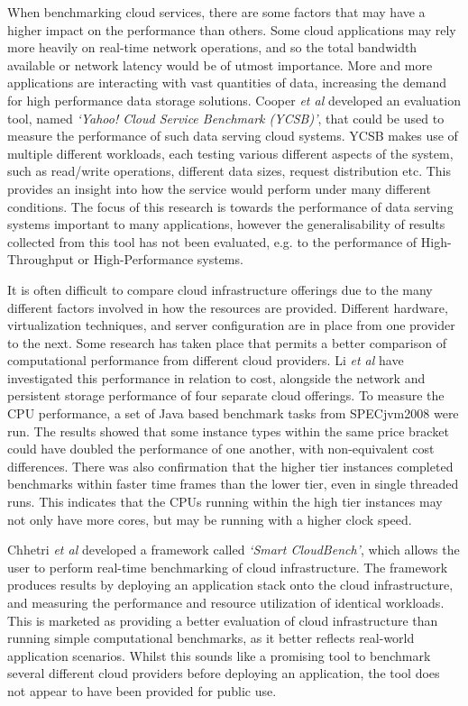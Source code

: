 \documentclass{entcs} \usepackage{entcsmacro}
\begin{document}
When benchmarking cloud services, there are some factors that may have a higher impact on the performance than others. Some cloud applications may rely more heavily on real-time network operations, and so the total bandwidth available or network latency would be of utmost importance. More and more applications are interacting with vast quantities of data, increasing the demand for high performance data storage solutions. Cooper \textit{et al}\cite{cooper2010benchmarking} developed an evaluation tool, named \textit{`Yahoo! Cloud Service Benchmark (YCSB)'}, that could be used to measure the performance of such data serving cloud systems. YCSB makes use of multiple different workloads, each testing various different aspects of the system, such as read/write operations, different data sizes, request distribution etc. This provides an insight into how the service would perform under many different conditions. The focus of this research is towards the performance of data serving systems important to many applications, however the generalisability of results collected from this tool has not been evaluated, e.g. to the performance of High-Throughput or High-Performance systems.

It is often difficult to compare cloud infrastructure offerings due to the many different factors involved in how the resources are provided. Different hardware, virtualization techniques, and server configuration are in place from one provider to the next\cite{chhetri2013smart}. Some research has taken place that permits a better comparison of computational performance from different cloud providers. Li \textit{et al}\cite{li2010cloudcmp} have investigated this performance in relation to cost, alongside the network and persistent storage performance of four separate cloud offerings. To measure the CPU performance, a set of Java based benchmark tasks from SPECjvm2008 were run. The results showed that some instance types within the same price bracket could have doubled the performance of one another, with non-equivalent cost differences. There was also confirmation that the higher tier instances completed benchmarks within faster time frames than the lower tier, even in single threaded runs. This indicates that the CPUs running within the high tier instances may not only have more cores, but may be running with a higher clock speed.

Chhetri \textit{et al}\cite{chhetri2013smart} developed a framework called \textit{`Smart CloudBench'}, which allows the user to perform real-time benchmarking of cloud infrastructure. The framework produces results by deploying an application stack onto the cloud infrastructure, and measuring the performance and resource utilization of identical workloads. This is marketed as providing a better evaluation of cloud infrastructure than running simple computational benchmarks, as it better reflects real-world application scenarios. Whilst this sounds like a promising tool to benchmark several different cloud providers before deploying an application, the tool does not appear to have been provided for public use.
\end{document}
